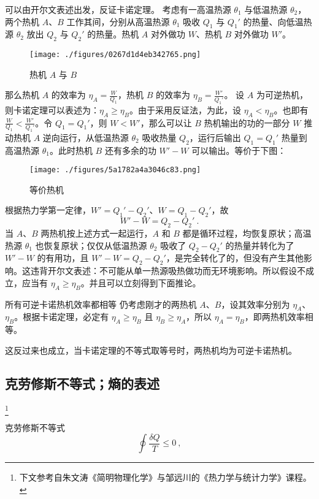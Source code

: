 可以由开尔文表述出发，反证卡诺定理。
考虑有一高温热源 $\theta_1$ 与低温热源 $\theta_2$，两个热机 $A$、$B$ 工作其间，分别从高温热源 $\theta_1$ 吸收 $Q_1$ 与 $Q_1'$ 的热量、向低温热源 $\theta_2$ 放出 $Q_2$ 与 $Q_2'$ 的热量。热机 $A$ 对外做功 $W$、热机 $B$ 对外做功 $W'$。
\begin{figure}[ht]
\centering
\texttt{[image: ./figures/0267d1d4eb342765.png]}
\caption{热机 $A$ 与 $B$} \label{fig_Td2Law_8}
\end{figure}
那么热机 $A$ 的效率为 $\eta_A = \frac{W}{Q_1}$，热机 $B$ 的效率为 $\eta_B = \frac{W'}{Q_1'}$。
设 $A$ 为可逆热机，则卡诺定理可以表述为：$\eta_A \ge \eta_B$。由于采用反证法，为此，设 $\eta_A < \eta_B$。也即有 $\frac{W}{Q_1}<\frac{W'}{Q_1'}$。令 $Q_1=Q_1'$，则 $W<W'$，那么可以让 $B$ 热机输出的功的一部分 $W$ 推动热机 $A$ 逆向运行，从低温热源 $\theta_2$ 吸收热量 $Q_2$，运行后输出 $Q_1=Q_1'$ 热量到高温热源 $\theta_1$。此时热机 $B$ 还有多余的功 $W'-W$ 可以输出。等价于下图：
\begin{figure}[ht]
\centering
\texttt{[image: ./figures/5a1782a4a3046c83.png]}
\caption{等价热机} \label{fig_Td2Law_9}
\end{figure}
根据热力学第一定律，$W'=Q_1'-Q_2'$、$W=Q_1-Q_2'$，故
$$W'-W=Q_2-Q_2' ~.$$
当 $A$、$B$ 两热机按上述方式一起运行，$A$ 和 $B$ 都是循环过程，均恢复原状；高温热源 $\theta_1$ 也恢复原状；仅仅从低温热源 $\theta_2$ 吸收了 $Q_2-Q_2'$ 的热量并转化为了 $W'-W$ 的有用功，且 $W'-W=Q_2-Q_2'$，是完全转化了的，但没有产生其他影响。这违背开尔文表述：不可能从单一热源吸热做功而无环境影响。所以假设不成立，应当有 $\eta_A \ge \eta_B$。并且可以立刻得到下面推论。
\begin{corollary}{所有可逆卡诺热机效率都相等}
仍考虑刚才的两热机 $A$、$B$，设其效率分别为 $\eta_A$、$\eta_B$。根据卡诺定理，必定有 $\eta_A \ge \eta_B$ 且 $\eta_B \ge \eta_A$，所以 $\eta_A = \eta_B$，即两热机效率相等。
\end{corollary}
这反过来也成立，当卡诺定理的不等式取等号时，两热机均为可逆卡诺热机。

\subsection{克劳修斯不等式；熵的表述}\label{sub_Td2Law_3}
\footnote{下文参考自朱文涛《简明物理化学》与邹远川的《热力学与统计力学》课程。}

\begin{theorem}{克劳修斯不等式}
\begin{equation}
\oint \frac{\delta Q}{T} \leq 0 ~,
\end{equation}
\end{theorem}

